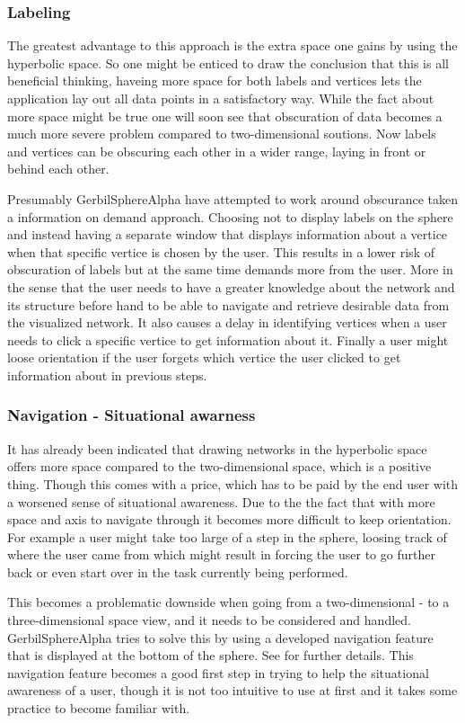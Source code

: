 \documentclass[a4paper,11pt]{kth-mag}
\begin{document}
\subsubsection{Labeling}
The greatest advantage to this approach is the extra space one gains by using the hyperbolic space. So one might be enticed to draw the conclusion that this is all beneficial thinking,
haveing more space for both labels and vertices lets the application lay out all data points in a satisfactory way. While the fact about more space might be true one will soon see that
obscuration of data becomes a much more severe problem compared to two-dimensional soutions. Now labels and vertices can be obscuring each other in a wider range, laying in front or behind each other.
 
Presumably GerbilSphereAlpha have attempted to work around obscurance taken a information on demand approach. Choosing not to display labels on the
sphere and instead having a separate window that displays information about a vertice when that specific vertice is chosen by the user.
This results in a lower risk of obscuration of labels but at the same time demands more from the user. More in the
sense that the user needs to have a greater knowledge about the network and its structure before hand to be able
to navigate and retrieve desirable data from the visualized network. It also causes a delay in identifying 
vertices when a user needs to click a specific vertice to get information about it. Finally a user might loose orientation
if the user forgets which vertice the user clicked to get information about in previous steps.
\subsubsection{Navigation - Situational awarness}
It has already been indicated that drawing networks in the hyperbolic space offers more space compared to the
two-dimensional space, which is a positive thing. Though this comes with a price, which has to be paid by the end user with a
worsened sense of situational awareness. Due to the the fact that with more space and axis to navigate through it becomes more difficult to keep orientation.
For example a user might take too large of a step in the sphere, loosing track of where the user came from which might result in forcing the user to go further back
or even start over in the task currently being performed.

This becomes a problematic downside when going from a two-dimensional - to a three-dimensional space view, and it needs to be considered and handled. 
GerbilSphereAlpha tries to solve this by using a developed navigation feature that is displayed at the
bottom of the sphere. See \cite{Shelley20121016} for further details. This navigation feature becomes a good first step in 
trying to help the situational awareness of a user, though it is not too intuitive to use at first and it takes some practice to become familiar with.
\end{document}
